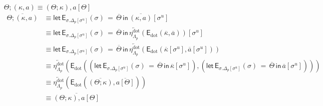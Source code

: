 \documentclass[10pt]{article}
\theoremstyle{definition}
\newcommand{\rewrite}[2]{\overleftarrow{#1}(#2)}
\newcommand\EEs[4]{\ensuremath{\mathsf{let} \, \mathsf{E}_{#1}(#3) \, = \, {#2} \, \mathsf{in} \, #4}}
\newcommand\EIs[2]{\ensuremath{\mathsf{E}_{#1}{(#2)}}}
\newcommand\unp[2]{\ensuremath{{#2}^u}}
\newcommand{\modeof}[1]{{#1}_p}
\newcommand{\sdot}{\ensuremath{\mathrm{dot}}}
\newcommand{\upstairs}[1]{\overline{#1}}
\begin{document}
\begin{enumerate}[style = multiline, labelwidth = 80pt]
\item[{$\Theta ; (\kappa , a) \equiv (\Theta ; \kappa) , a[\Theta]$}]
\begin{align*}
\upstairs{\Theta ; (\kappa , a)}
&\equiv \EEs{\sigma.\modeof{\Delta}[\unp{\Delta}{\sigma}]}{\upstairs{\Theta}}{\sigma}{\upstairs{(\kappa , a)}[\unp{\upstairs{\Delta}}{\sigma}]} \\
&\equiv \EEs{\sigma.\modeof{\Delta}[\unp{\Delta}{\sigma}]}{\upstairs{\Theta}}{\sigma}{\rewrite{\eta^\sdot_{\modeof{\Lambda}}}{\EIs{\sdot}{\upstairs{\kappa}, \upstairs{a}}}[\unp{\upstairs{\Delta}}{\sigma}]} \\
&\equiv \EEs{\sigma.\modeof{\Delta}[\unp{\Delta}{\sigma}]}{\upstairs{\Theta}}{\sigma}{\rewrite{\eta^\sdot_{\modeof{\Lambda}}}{\EIs{\sdot}{\upstairs{\kappa}[\unp{\upstairs{\Delta}}{\sigma}], \upstairs{a}[\unp{\upstairs{\Delta}}{\sigma}]}}} \\
&\equiv \rewrite{\eta^\sdot_{\modeof{\Lambda}}}{\EIs{\sdot}{(\EEs{\sigma.\modeof{\Delta}[\unp{\Delta}{\sigma}]}{\upstairs{\Theta}}{\sigma}{\upstairs{\kappa}[\unp{\upstairs{\Delta}}{\sigma}]}), (\EEs{\sigma.\modeof{\Delta}[\unp{\Delta}{\sigma}]}{\upstairs{\Theta}}{\sigma}{\upstairs{a}[\unp{\upstairs{\Delta}}{\sigma}]})}} \\
&\equiv \rewrite{\eta^\sdot_{\modeof{\Lambda}}}{\EIs{\sdot}{\upstairs{(\Theta ; \kappa)}, \upstairs{a[\Theta]}}} \\
&\equiv \upstairs{(\Theta ; \kappa) , a[\Theta]}
\end{align*} 


\end{enumerate}
\end{document}

